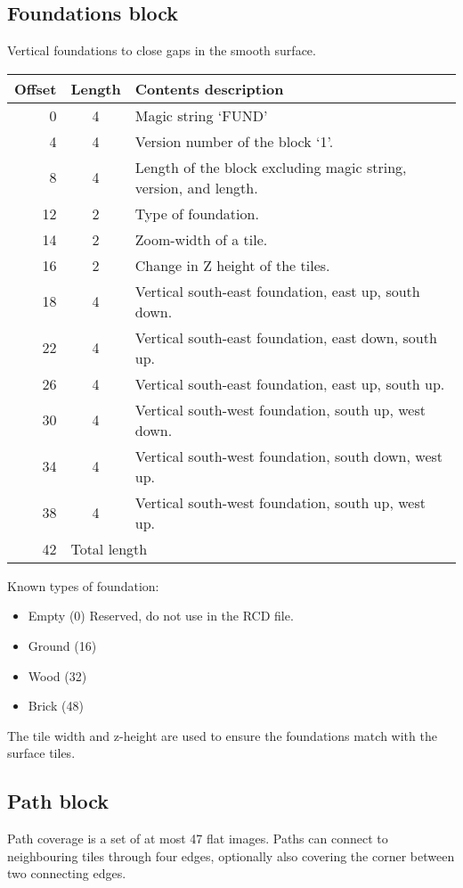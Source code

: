\documentclass{article}
\begin{document}
\subsection{Foundations block}
Vertical foundations to close gaps in the smooth surface.

\begin{center}
\begin{tabular}{|r|c|l|} \hline
\textbf{Offset} & \textbf{Length} & \textbf{Contents description} \\ \hline
  0 &  4 & Magic string `FUND' \\
  4 &  4 & Version number of the block `1'. \\
  8 &  4 & Length of the block excluding magic string, version, and length. \\
 12 &  2 & Type of foundation. \\
 14 &  2 & Zoom-width of a tile. \\
 16 &  2 & Change in Z height of the tiles. \\
 18 &  4 & Vertical south-east foundation, east up, south down. \\
 22 &  4 & Vertical south-east foundation, east down, south up. \\
 26 &  4 & Vertical south-east foundation, east up, south up. \\
 30 &  4 & Vertical south-west foundation, south up, west down. \\
 34 &  4 & Vertical south-west foundation, south down, west up. \\
 38 &  4 & Vertical south-west foundation, south up, west up. \\ \hline
 42 & \multicolumn{2}{l|}{Total length} \\ \hline
\end{tabular}
\end{center}

\medskip
\noindent
Known types of foundation:
\begin{itemize}
\item Empty (0) Reserved, do not use in the RCD{} file.
\item Ground (16)
\item Wood (32)
\item Brick (48)
\end{itemize}

The tile width and z-height are used to ensure the foundations match with the
surface tiles.

\subsection{Path block}
Path coverage is a set of at most 47 flat images. Paths can connect to
neighbouring tiles through four edges, optionally also covering the corner
between two connecting edges.
\end{document}
